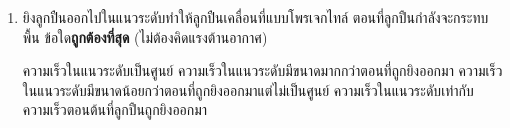 \begin{enumerate}
	\item \runningj \nonet ยิงลูกปืนออกไปในแนวระดับทําให้ลูกปืนเคลื่อนที่แบบโพรเจกไทล์   ตอนที่ลูกปืนกําลังจะกระทบพื้น  ข้อใด\textbf{ถูกต้องที่สุด}   (ไม่ต้องคิดแรงต้านอากาศ)
	\begin{1c}
		{ความเร็วในแนวระดับเป็นศูนย์}
		{ความเร็วในแนวระดับมีขนาดมากกว่าตอนที่ถูกยิงออกมา }
		{ความเร็วในแนวระดับมีขนาดน้อยกว่าตอนที่ถูกยิงออกมาแต่ไม่เป็นศูนย์}
		{ความเร็วในแนวระดับเท่ากับความเร็วตอนต้นที่ลูกปืนถูกยิงออกมา}
	\end{1c}
\end{enumerate}
